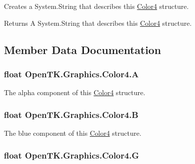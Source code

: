 Creates a System.\-String that describes this \hyperlink{struct_open_t_k_1_1_graphics_1_1_color4}{Color4} structure. 

\begin{DoxyReturn}{Returns}
A System.\-String that describes this \hyperlink{struct_open_t_k_1_1_graphics_1_1_color4}{Color4} structure.
\end{DoxyReturn}


\subsection{Member Data Documentation}
\hypertarget{struct_open_t_k_1_1_graphics_1_1_color4_aab0da6a29661ca8b86a2325024cb4d6d}{
\subsubsection[{A}]{\setlength{\rightskip}{0pt plus 5cm}float Open\-T\-K.\-Graphics.\-Color4.\-A}}\label{struct_open_t_k_1_1_graphics_1_1_color4_aab0da6a29661ca8b86a2325024cb4d6d}


The alpha component of this \hyperlink{struct_open_t_k_1_1_graphics_1_1_color4}{Color4} structure. 

\hypertarget{struct_open_t_k_1_1_graphics_1_1_color4_a6c305a3340d060eb289f016ec92381c7}{
\subsubsection[{B}]{\setlength{\rightskip}{0pt plus 5cm}float Open\-T\-K.\-Graphics.\-Color4.\-B}}\label{struct_open_t_k_1_1_graphics_1_1_color4_a6c305a3340d060eb289f016ec92381c7}


The blue component of this \hyperlink{struct_open_t_k_1_1_graphics_1_1_color4}{Color4} structure. 

\hypertarget{struct_open_t_k_1_1_graphics_1_1_color4_a3b12c36dbeeef92ea80dba5dab716d6a}{
\subsubsection[{G}]{\setlength{\rightskip}{0pt plus 5cm}float Open\-T\-K.\-Graphics.\-Color4.\-G}}\label{struct_open_t_k_1_1_graphics_1_1_color4_a3b12c36dbeeef92ea80dba5dab716d6a}


